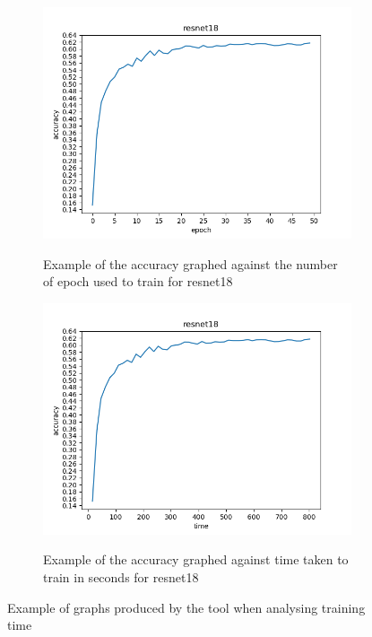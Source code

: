 \begin{figure}[th]
     \begin{subfigure}[b]{0.5\textwidth}
	    \includegraphics[width = \gw cm]{img/resnet18_epoch-accuracy.png}
	    \caption[Example of accuracy over epoch]{Example of the accuracy graphed against the number of epoch used to train for resnet18}{\centering}
	    \label{fig:res_epo_acc}
     \end{subfigure}
     \begin{subfigure}[b]{0.5\textwidth}
	    \includegraphics[width = \gw cm]{img/resnet18_time-accuracy.png}
	    \caption[Example of accuracy over time]{Example of the accuracy graphed against time taken to train in seconds for resnet18}{\centering}
	    \label{fig:res_time_acc}
     \end{subfigure}
        \caption{Example of graphs produced by the tool when analysing training time}
        \label{fig:training_time_graphs}
\end{figure}








